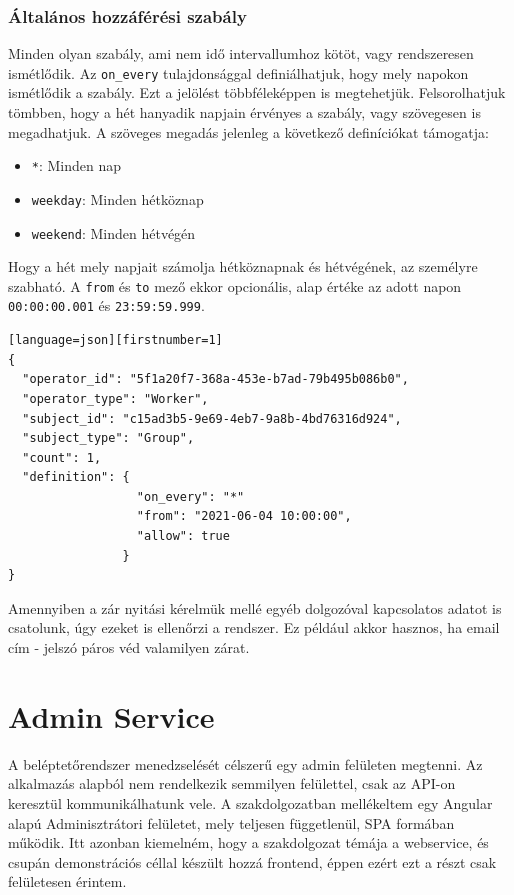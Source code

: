 \documentclass[a4paper,12pt]{thesis-ekf}
\theoremstyle{definition}
\begin{document}
			\subsection{Általános hozzáférési szabály}
				Minden olyan szabály, ami nem idő intervallumhoz kötöt, vagy rendszeresen ismétlődik. Az \texttt{on\_every} tulajdonsággal definiálhatjuk, hogy mely napokon ismétlődik a szabály. Ezt a jelölést többféleképpen is megtehetjük. Felsorolhatjuk tömbben, hogy a hét hanyadik napjain érvényes a szabály, vagy szövegesen is megadhatjuk. A szöveges megadás jelenleg a következő definíciókat támogatja:
				\begin{itemize}
					\item \texttt{*}: Minden nap
					\item \texttt{weekday}: Minden hétköznap
					\item \texttt{weekend}: Minden hétvégén
				\end{itemize}
				Hogy a hét mely napjait számolja hétköznapnak és hétvégének, az személyre szabható. A \texttt{from} és \texttt{to} mező ekkor opcionális, alap értéke az adott napon \texttt{00:00:00.001} és \texttt{23:59:59.999}.
				
				\begin{lstlisting}[caption={Egy p\'elda \'altal\'anos szab\'aly l\'etrehoz\'asa},captionpos=b][language=json][firstnumber=1]
{
  "operator_id": "5f1a20f7-368a-453e-b7ad-79b495b086b0",
  "operator_type": "Worker",
  "subject_id": "c15ad3b5-9e69-4eb7-9a8b-4bd76316d924",
  "subject_type": "Group",
  "count": 1,
  "definition": {
                  "on_every": "*"
                  "from": "2021-06-04 10:00:00",
                  "allow": true
                }
}
			\end{lstlisting}
		
			Amennyiben a zár nyitási kérelmük mellé egyéb dolgozóval kapcsolatos adatot is csatolunk, úgy ezeket is ellenőrzi a rendszer. Ez például akkor hasznos, ha email cím - jelszó páros véd valamilyen zárat.
		
	\chapter{Admin Service}
		A beléptetőrendszer menedzselését célszerű egy admin felületen megtenni. Az alkalmazás alapból nem rendelkezik semmilyen felülettel, csak az API-on keresztül kommunikálhatunk vele. A szakdolgozatban mellékeltem egy Angular alapú Adminisztrátori felületet, mely teljesen függetlenül, SPA formában működik. Itt azonban kiemelném, hogy a szakdolgozat témája a webservice, és csupán demonstrációs céllal készült hozzá frontend, éppen ezért ezt a részt csak felületesen érintem.
		
\end{document}
